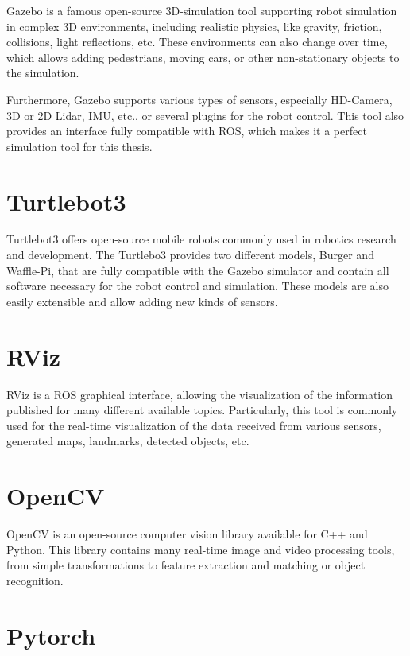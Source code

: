 Gazebo is a famous open-source 3D-simulation tool supporting robot simulation in complex 3D environments, including realistic physics, like gravity, friction, collisions, light reflections, etc. These environments can also change over time, which allows adding pedestrians, moving cars, or other non-stationary objects to the simulation.\par
Furthermore, Gazebo supports various types of sensors, especially HD-Camera, 3D or 2D Lidar, IMU, etc., or several plugins for the robot control. This tool also provides an interface fully compatible with ROS, which makes it a perfect simulation tool for this thesis.

\section{Turtlebot3}\label{section:turtlebot}

Turtlebot3 offers open-source mobile robots commonly used in robotics research and development. The Turtlebo3 provides two different models, Burger and Waffle-Pi, that are fully compatible with the Gazebo simulator and contain all software necessary for the robot control and simulation. These models are also easily extensible and allow adding new kinds of sensors.

\section{RViz}\label{section:rviz}

RViz is a ROS graphical interface, allowing the visualization of the information published for many different available topics. Particularly, this tool is commonly used for the real-time visualization of the data received from various sensors, generated maps, landmarks, detected objects, etc.

\section{OpenCV}\label{section:openCv}

OpenCV\cite{OpenCV} is an open-source computer vision library available for C++ and Python. This library contains many real-time image and video processing tools, from simple transformations to feature extraction and matching or object recognition.

\section{Pytorch}\label{section:pytorch}

